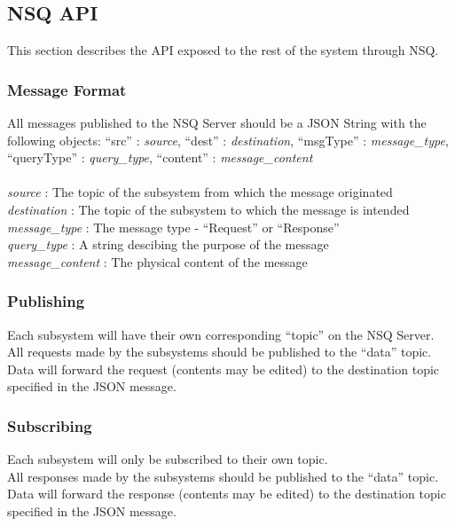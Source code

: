 \subsection{NSQ API}
This section describes the API exposed to the rest of the system through NSQ.
\subsubsection{Message Format}
All messages published to the NSQ Server should be a JSON String with the following objects: 
``src'' : \textit{source}, ``dest'' : \textit{destination}, ``msgType'' : \textit{message_type}, ``queryType'' : \textit{query_type}, ``content'' : \textit{message_content} \\ \\

\textit{source} : The topic of the subsystem from which the message originated \\
\textit{destination} : The topic of the subsystem to which the message is intended \\
\textit{message_type} : The message type - ``Request'' or ``Response'' \\
\textit{query_type} : A string descibing the purpose of the message \\
\textit{message_content} : The physical content of the message \\

\subsubsection{Publishing}
Each subsystem will have their own corresponding ``topic'' on the NSQ Server. \\
All requests made by the subsystems should be published to the ``data'' topic. \\
Data will forward the request (contents may be edited) to the destination topic specified in the JSON message. \\

\subsubsection{Subscribing}
Each subsystem will only be subscribed to their own topic. \\
All responses made by the subsystems should be published to the ``data'' topic. \\
Data will forward the response (contents may be edited) to the destination topic specified in the JSON message. \\




